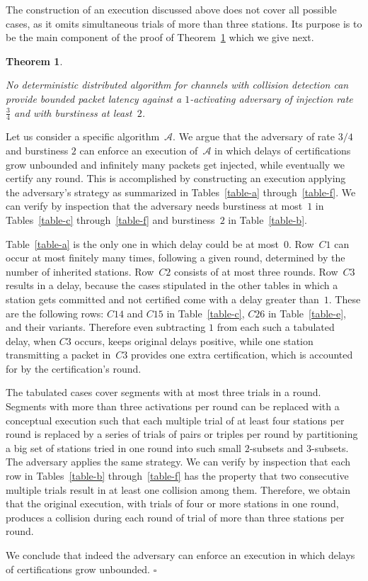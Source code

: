 \documentclass[11pt]{article}
\newcommand{\cA}{{\mathcal A}}
\newcommand{\qed}{\hfill $\square$ \smallbreak}
\newenvironment{proof}{\noindent{\bf Proof:}}{\qed}
\newtheorem{theorem}{Theorem}
\begin{document}
The construction of an execution discussed above does not cover all possible cases, as it omits simultaneous trials of more than three stations.
Its purpose is to be the main component of the proof of Theorem~\ref{thm:impossibility-for-rate-more-than-3/4} which we give next.



\begin{theorem}
\label{thm:impossibility-for-rate-more-than-3/4}

No deterministic distributed algorithm for channels with collision detection can provide bounded packet latency against a $1$-activating  adversary of injection rate~$\frac{3}{4}$ and with burstiness at least~$2$.
\end{theorem}

\begin{proof} 
Let us consider a specific algorithm~$\cA$.
We argue that the adversary of rate $3/4$ and burstiness $2$ can enforce an execution of~$\cA$ in which delays of certifications grow unbounded and infinitely many packets get injected, while eventually we certify any round.
This is accomplished by constructing an execution applying the adversary's strategy as summarized in Tables~\ref{table-a} through~\ref{table-f}.
We can verify by inspection that the adversary needs burstiness at most~$1$ in Tables~\ref{table-c} through~\ref{table-f} and burstiness~$2$ in Table~\ref{table-b}.

Table~\ref{table-a} is the only one in which delay could be at most~$0$.
Row~$C1$ can occur at most finitely many times, following a given round, determined by the number of inherited stations.
Row~$C2$ consists of at most three rounds.
Row~$C3$ results in a delay, because the cases stipulated in the other tables in which a station gets committed and not certified come with a delay greater than~$1$.
These are the following rows: $C14$ and $C15$ in Table~\ref{table-c}, $C26$ in Table~\ref{table-e}, and their variants.
Therefore even subtracting $1$ from each such a tabulated delay, when $C3$ occurs, keeps  original delays positive, while one station transmitting a packet in~$C3$ provides one extra certification, which is accounted for by the certification's round.

The tabulated cases cover segments with at most three trials in a round.
Segments with more than three activations per round can be replaced with a conceptual execution  such that each multiple trial of at least four stations per round is replaced by a series of trials of pairs or triples per round by partitioning a big set of stations tried in one round into such small $2$-subsets and $3$-subsets.
The adversary applies the same strategy.
We can verify by inspection that each row in Tables~\ref{table-b} through~\ref{table-f} has the property that two consecutive multiple trials result in at least one collision among them.
Therefore, we obtain that the original execution, with trials of  four or more stations in one round, produces a collision during each round of trial of more than three stations per round.

We conclude that indeed the adversary can enforce an execution in which delays of certifications grow unbounded.
\end{proof} 
\end{document}
